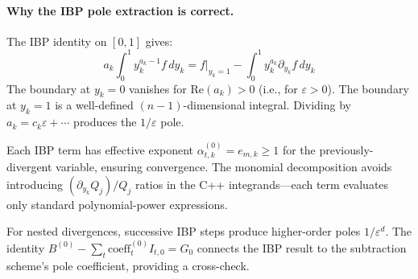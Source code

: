 \documentclass[11pt,a4paper]{article}
\begin{document}
\paragraph{Why the IBP pole extraction is correct.}
The IBP identity on $[0,1]$ gives:
\begin{equation}
a_k \int_0^1 y_k^{a_k-1}f\,dy_k = f\big|_{y_k=1} - \int_0^1 y_k^{a_k}\partial_{y_k}f\,dy_k
\end{equation}
The boundary at $y_k=0$ vanishes for $\mathrm{Re}(a_k)>0$ (i.e., for $\varepsilon>0$). The boundary at $y_k=1$ is a well-defined $(n{-}1)$-dimensional integral.  Dividing by $a_k = c_k\varepsilon + \cdots$ produces the $1/\varepsilon$ pole.

Each IBP term has effective exponent $\alpha_{t,k}^{(0)} = e_{m,k} \geq 1$ for the previously-divergent variable, ensuring convergence.  The monomial decomposition avoids introducing $(\partial_{y_k}Q_j)/Q_j$ ratios in the C++ integrands---each term evaluates only standard polynomial-power expressions.

For nested divergences, successive IBP steps produce higher-order poles $1/\varepsilon^d$.  The identity $B^{(0)} - \sum_t \mathrm{coeff}_t^{(0)} I_{t,0} = G_0$ connects the IBP result to the subtraction scheme's pole coefficient, providing a cross-check.
\end{document}
